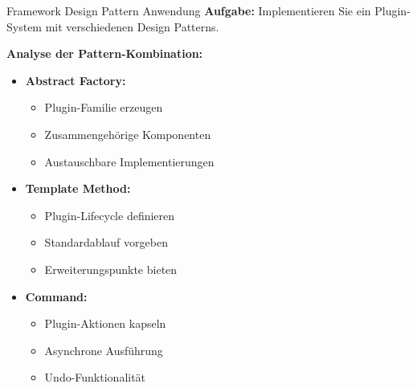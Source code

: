 \begin{example2}{Framework Design Pattern Anwendung}
\textbf{Aufgabe:}
Implementieren Sie ein Plugin-System mit verschiedenen Design Patterns.

\textbf{Analyse der Pattern-Kombination:}
\begin{itemize}
    \item \textbf{Abstract Factory:}
    \begin{itemize}
        \item Plugin-Familie erzeugen
        \item Zusammengehörige Komponenten
        \item Austauschbare Implementierungen
    \end{itemize}
    
    \item \textbf{Template Method:}
    \begin{itemize}
        \item Plugin-Lifecycle definieren
        \item Standardablauf vorgeben
        \item Erweiterungspunkte bieten
    \end{itemize}
    
    \item \textbf{Command:}
    \begin{itemize}
        \item Plugin-Aktionen kapseln
        \item Asynchrone Ausführung
        \item Undo-Funktionalität
    \end{itemize}
\end{itemize}
\end{example2}

